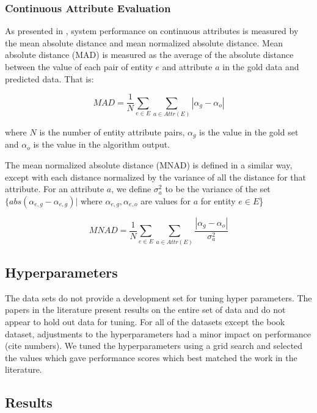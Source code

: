 \documentclass{acm_proc_article-sp}
\begin{document}
\subsubsection{Continuous Attribute Evaluation}

As presented in \cite{li:resolving}, system performance on continuous attributes is measured by the mean absolute distance and mean normalized absolute distance. Mean absolute distance (MAD) is measured as the average of the absolute distance between the value of each pair of entity $e$ and attribute $a$ in the gold data and predicted data. That is:

\begin{equation}
MAD = \frac{1}{N} \sum_{e \in E} \sum_{a \in Attr(E)} | \alpha_g - \alpha_o |
\end{equation}

where $N$ is the number of entity attribute pairs, $\alpha_g$ is the value in the gold set and $\alpha_o$ is the value in the algorithm output. 

The mean normalized absolute distance (MNAD) is defined in a similar way, except with each distance normalized by the variance of all the distance for that attribute. For an attribute $a$, we define $\sigma^2_a$ to be the variance of the set $\{ abs(\alpha_{e,g}-\alpha_{e,g}) |$ where $\alpha_{e,g}, \alpha_{e,o}$ are values for  $a$ for entity $e \in E$\} 

\begin{equation}
MNAD = \frac{1}{N} \sum_{e \in E} \sum_{a \in Attr(E)} \frac{| \alpha_g - \alpha_o |}{\sigma^2_a}
\end{equation}

\subsection{Hyperparameters}

The data sets do not provide a development set for tuning hyper parameters. The papers in the literature present results on the entire set of data and do not appear to hold out data for tuning. For all of the datasets except the book dataset, adjustments to the hyperparameters  had a minor impact on performance (cite numbers). We tuned the hyperparameters  using a grid search and selected the values which gave performance scores which best matched the work in the literature. 

\subsection{Results} \label{sec:results}
\end{document}
